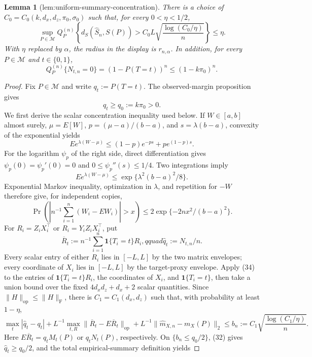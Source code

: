 \documentclass{article}
\newtheorem{lemma}{Lemma}
\begin{document}
\begin{lemma}[lem:uniform-summary-concentration]\label{lem:uniform-summary-concentration}
There is a choice of \(C_0=C_0(k,d_x,d_z,\pi_0,\sigma_0)\) such that, for every \(0<\eta<1/2\),
\[
 \sup_{P\in\mathcal M}Q_P^{(n)}\!\left\{d_S(\widehat S_n,S(P))>
 C_0L\sqrt{\frac{\log(C_0/\eta)}{n}}\right\}\le \eta.
\]
With \(\eta\) replaced by \(\alpha\), the radius in the display is \(r_{n,\alpha}\).  In addition, for every \(P\in\mathcal M\) and \(t\in\{0,1\}\),
\[
 Q_P^{(n)}\{N_{t,n}=0\}=(1-P(T=t))^n\le(1-k\pi_0)^n.
\]
\end{lemma}
\begin{proof}
Fix \(P\in\mathcal M\) and write \(q_t:=P(T=t)\).  The observed-margin proposition gives
\[
q_t\ge q_0:=k\pi_0>0.                                                          \tag{32}
\]
We first derive the scalar concentration inequality used below.  If \(W\in[a,b]\) almost surely, \(\mu=E[W]\), \(p=(\mu-a)/(b-a)\), and \(s=\lambda(b-a)\), convexity of the exponential yields
\[
Ee^{\lambda(W-\mu)}\le(1-p)e^{-ps}+pe^{(1-p)s}.
\]
For the logarithm \(\psi_p\) of the right side, direct differentiation gives \(\psi_p(0)=\psi_p'(0)=0\) and \(0\le\psi_p''(s)\le1/4\).  Two integrations imply
\[
Ee^{\lambda(W-\mu)}\le\exp\{\lambda^2(b-a)^2/8\}.                            \tag{33}
\]
Exponential Markov inequality, optimization in \(\lambda\), and repetition for \(-W\) therefore give, for independent copies,
\[
\Pr\!\left(\left|n^{-1}\sum_{i=1}^n(W_i-EW_i)\right|>x\right)
\le2\exp\{-2nx^2/(b-a)^2\}.                                                   \tag{34}
\]
For \(R_i=Z_iX_i^\top\) or \(R_i=Y_iZ_iX_i^\top\), put
\[
\overline R_t:=n^{-1}\sum_{i=1}^n\mathbf1\{T_i=t\}R_i,qquad
\widehat q_t:=N_{t,n}/n.
\]
Every scalar entry of either \(R_i\) lies in \([-L,L]\) by the two matrix envelopes; every coordinate of \(X_i\) lies in \([-L,L]\) by the target-proxy envelope.  Apply (34) to the entries of \(\mathbf1\{T_i=t\}R_i\), the coordinates of \(X_i\), and \(\mathbf1\{T_i=t\}\), then take a union bound over the fixed \(4d_xd_z+d_x+2\) scalar quantities.  Since \(\lVert H\rVert_{\mathrm{op}}\le\lVert H\rVert_{\mathrm F}\), there is \(C_1=C_1(d_x,d_z)\) such that, with probability at least \(1-\eta\),
\[
\max_t|\widehat q_t-q_t|
+L^{-1}\max_{t,R}\lVert\overline R_t-E\overline R_t\rVert_{\mathrm{op}}
+L^{-1}\lVert\widehat m_{X,n}-m_X(P)\rVert_2
\le b_n:=C_1\sqrt{\frac{\log(C_1/\eta)}n}.                                   \tag{35}
\]
Here \(E\overline R_t=q_tM_t(P)\) or \(q_tN_t(P)\), respectively.  On \(\{b_n\le q_0/2\}\), (32) gives \(\widehat q_t\ge q_0/2\), and the total empirical-summary definition yields

\end{proof}
\end{document}
